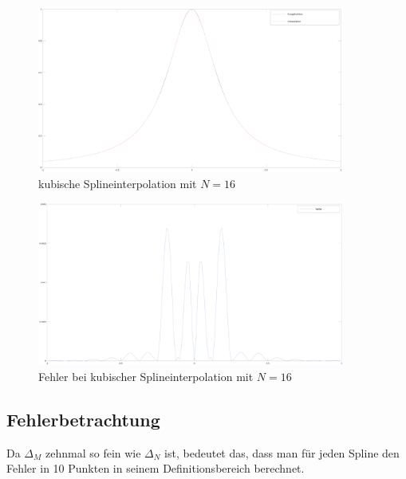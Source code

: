 \documentclass[ngerman,a4paper]{texmf/tex/latex/mathscript/mathscript}
\begin{document}
	\begin{figure}[h]
		\centering
		\includegraphics[width=0.9\textwidth]{images/Runge_kubische_Interpolation.png}
		\caption{kubische Splineinterpolation mit $N=16$}
	\end{figure}
	\pagebreak
	
	\begin{figure}[h]
		\centering
		\includegraphics[width=0.9\textwidth]{images/Runge_kubische_Interpolation_Fehler.png}
		\caption{Fehler bei kubischer Splineinterpolation mit $N=16$}
	\end{figure}
	
	\subsection{Fehlerbetrachtung}
	
	Da $\Delta_M$ zehnmal so fein wie $\Delta_N$ ist, bedeutet das, dass man für jeden Spline den Fehler in 10 Punkten in seinem Definitionsbereich berechnet.
	
\end{document}
